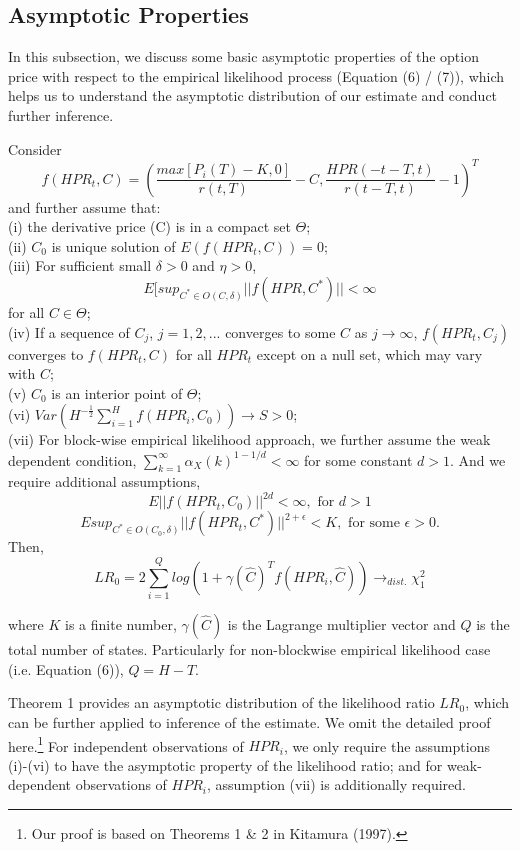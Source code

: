 \subsection{Asymptotic Properties} 
In this subsection, we discuss some basic asymptotic properties of the option price with respect to the empirical likelihood process (Equation (6) / (7)), which helps us to understand the asymptotic distribution of our estimate and conduct further inference.  
\begin{theorem}
Consider 
\[
f(HPR_t,C)=(\frac{max[P_i(T)-K,0]}{r(t,T)}-C, \frac{HPR(-t-T,t)}{r(t-T,t)}-1)^T
\]
and further assume that:\\
(i) the derivative price (C) is in a compact set $\Theta$; \\
(ii) $C_0$ is unique solution of $E(f(HPR_t,C))=0$;\\
(iii) For sufficient small $\delta>0$ and $\eta>0$, 
\[
E[sup_{C^*\in O(C,\delta)}||f(HPR,C^*)||<\infty 
\]
for all $C \in \Theta$;\\
(iv) If a sequence of $C_j$, $j=1,2,...$ converges to some $C$ as $j\rightarrow \infty$, $f(HPR_t,C_j)$ converges to $f(HPR_t,C)$ for all $HPR_t$ except on a null set, which may vary with $C$;\\
(v) $C_0$ is an interior point of $\Theta$;\\
(vi) $Var(H^{-\frac{1}{2}} \sum_{i=1}^H f(HPR_i,C_0))\rightarrow S >0$;\\
(vii) For block-wise empirical likelihood approach, we further assume the weak dependent condition, $\sum_{k=1}^\infty \alpha_X(k)^{1-1/d} <\infty$ for some constant $d>1$. And we require additional assumptions, 
\[
E||f(HPR_t,C_0)||^{2d}<\infty, \text{ for } d>1 
\]  
\[
E sup_{C^* \in O(C_0,\delta)} ||f(HPR_t,C^*)||^{2+\epsilon}<K, \text{ for some }\epsilon>0.
\]
Then, 
\[
LR_0=2\sum_{i=1}^Q log(1+\gamma(\hat{C})^T f(HPR_i,\hat{C})) \rightarrow_{dist.}  \chi _1^2
\]
\end{theorem}
where $K$ is a finite number, $\gamma(\hat{C})$ is the Lagrange multiplier vector and $Q$ is the total number of states. Particularly for non-blockwise empirical likelihood case (i.e. Equation (6)), $Q=H-T$.

Theorem 1 provides an asymptotic distribution of the likelihood ratio $LR_0$, which can be further applied to inference of the estimate. We omit the detailed proof here.\footnote{Our proof is based on Theorems 1 \& 2 in Kitamura (1997). } For independent observations of $HPR_i$, we only require the assumptions (i)-(vi) to have the asymptotic property of the likelihood ratio; and for weak-dependent observations of $HPR_i$, assumption (vii) is additionally required. 




